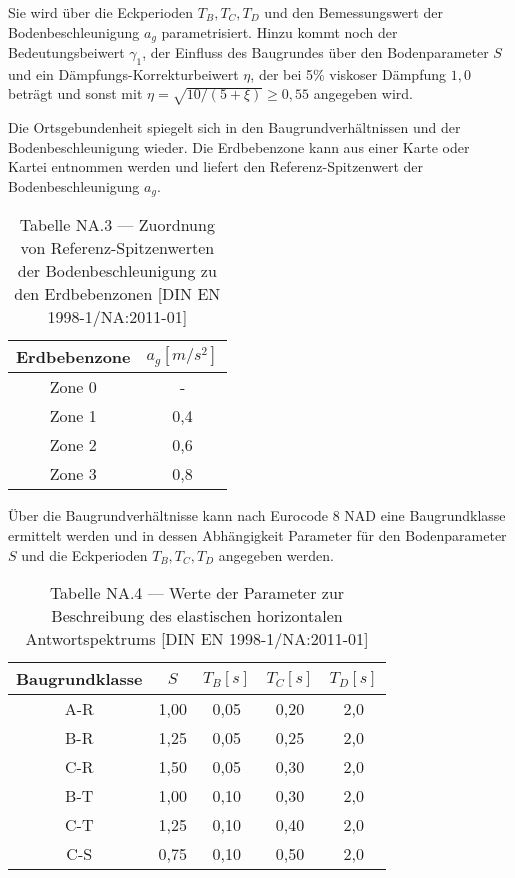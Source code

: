 Sie wird über die Eckperioden $T_B, T_C, T_D$ und den Bemessungswert der Bodenbeschleunigung $a_g$ parametrisiert. Hinzu kommt noch der Bedeutungsbeiwert $\gamma_1$, der Einfluss des Baugrundes über den Bodenparameter $S$ und ein Dämpfungs-Korrekturbeiwert $\eta$, der bei 5\% viskoser Dämpfung $1,0$ beträgt und sonst mit $\eta=\sqrt{10/(5+\xi)}\geq 0,55$ angegeben wird.

Die Ortsgebundenheit spiegelt sich in den Baugrundverhältnissen und der Bodenbeschleunigung wieder. Die Erdbebenzone kann aus einer Karte oder Kartei entnommen werden und liefert den Referenz-Spitzenwert der Bodenbeschleunigung $a_g$.

\begin{table}[H]
\centering
\begin{tabular}{ |c|c| } 
 \hline
 Erdbebenzone & $a_g [m/s^2]$ \\
 \hline\hline
 Zone 0 & - \\ 
 Zone 1 & 0,4 \\ 
 Zone 2 & 0,6 \\ 
 Zone 3 & 0,8 \\ 
 \hline
\end{tabular}
\caption{Tabelle NA.3 — Zuordnung von Referenz-Spitzenwerten der Bodenbeschleunigung zu den Erdbebenzonen [DIN EN 1998-1/NA:2011-01]}
\end{table}

Über die Baugrundverhältnisse kann nach Eurocode 8 NAD eine Baugrundklasse ermittelt werden und in dessen Abhängigkeit Parameter für den Bodenparameter $S$ und die Eckperioden $T_B, T_C, T_D$ angegeben werden.

\begin{table}[H]
\centering
\begin{tabular}{ |c|c|c|c|c| } 
 \hline
 Baugrundklasse & $S$ & $T_B [s]$ & $T_C [s]$ & $T_D [s]$\\
 \hline\hline
 A-R  & 1,00 & 0,05 & 0,20 & 2,0\\ 
 B-R  & 1,25 & 0,05 & 0,25 & 2,0\\ 
 C-R  & 1,50 & 0,05 & 0,30 & 2,0\\ 
 \hline
 B-T  & 1,00 & 0,10 & 0,30 & 2,0\\
 C-T  & 1,25 & 0,10 & 0,40 & 2,0\\
 \hline
 C-S  & 0,75 & 0,10 & 0,50 & 2,0\\
 \hline
\end{tabular}
\caption{Tabelle NA.4 — Werte der Parameter zur Beschreibung des elastischen horizontalen Antwortspektrums [DIN EN 1998-1/NA:2011-01]}
\end{table}

